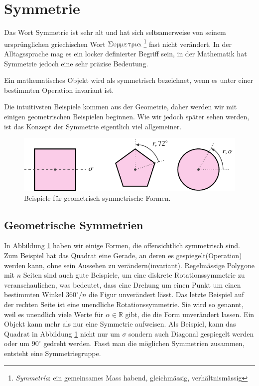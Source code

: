 \section{Symmetrie}
Das Wort Symmetrie ist sehr alt und hat sich seltsamerweise von seinem
ursprünglichen griechischen Wort
\(\mathrm{\Sigma\upsilon\mu\mu\varepsilon\tau\rho\iota\alpha}\)
\footnote{\emph{Symmetr\'ia}: ein gemeinsames Mass habend, gleichmässig,
verhältnismässig} fast nicht verändert. In der Alltagssprache mag es ein
locker definierter Begriff sein, in der Mathematik hat Symmetrie jedoch eine sehr
präzise Bedeutung.
\begin{definition}[Symmetrie]
	Ein mathematisches Objekt wird als symmetrisch bezeichnet, wenn es unter einer
	bestimmten Operation invariant ist.
\end{definition}
Die intuitivsten Beispiele kommen aus der Geometrie, daher werden wir mit
einigen geometrischen Beispielen beginnen. Wie wir jedoch später sehen werden,
ist das Konzept der Symmetrie eigentlich viel allgemeiner.  

\begin{figure}
	\centering
	\includegraphics{papers/punktgruppen/figures/symmetric-shapes}
	\caption{
		Beispiele für geometrisch symmetrische Formen.
		\label{fig:punktgruppen:geometry-example}
	}
\end{figure}

\subsection{Geometrische Symmetrien}

In Abbildung \ref{fig:punktgruppen:geometry-example} haben wir einige Formen,
die offensichtlich symmetrisch sind.  Zum Beispiel hat das Quadrat eine Gerade,
an deren es gespiegelt(Operation) werden kann, ohne sein Aussehen zu verändern(invariant). %
Regelmässige Polygone mit \(n\) Seiten sind auch gute Beispiele, um eine
diskrete Rotationssymmetrie zu veranschaulichen, was bedeutet, dass eine
Drehung um einen Punkt um einen bestimmten Winkel \(360^\circ/n\) die Figur 
unverändert lässt.  Das letzte Beispiel auf der rechten Seite ist eine
unendliche Rotationssymmetrie. Sie wird so genannt, weil es unendlich viele
Werte für \(\alpha \in \mathbb{R}\) gibt, die die Form unverändert lassen. 
Ein Objekt kann mehr als nur eine Symmetrie aufweisen.  Als Beispiel, kann das
Quadrat in Abbildung \ref{fig:punktgruppen:geometry-example} nicht nur um
\(\sigma\) sondern auch Diagonal gespiegelt werden oder um \(90^\circ\) gedreht
werden.  Fasst man die möglichen Symmetrien zusammen, entsteht eine
Symmetriegruppe.

